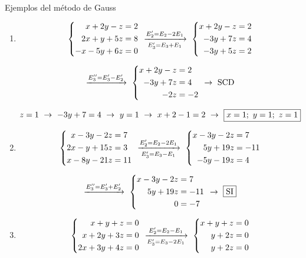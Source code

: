 \documentclass[11pt,a4paper]{article}
\newcommand{\fmdisp}[1]{\[\setbox2=\hbox{$\displaystyle #1$}\ifdim\wd2>\linewidth\resizebox{\linewidth}{!}{\box2}\else\box2\fi\]}
\begin{document}
\begin{fmex}{Ejemplos del método de Gauss}
\begin{enumerate}[label=\textbf{\arabic*.},leftmargin=*]
\item
\fmdisp{\left\{\begin{aligned}x+2y-z&=2\\ 2x+y+5z&=8\\ -x-5y+6z&=0\end{aligned}\right.\ \xrightarrow[E_3'=E_3+E_1]{E_2'=E_2-2E_1}\ \left\{\begin{aligned}x+2y-z&=2\\ -3y+7z&=4\\ -3y+5z&=2\end{aligned}\right.}

\fmdisp{\xrightarrow{E_3''=E_3'-E_2'}\ \left\{\begin{aligned}x+2y-z&=2\\ -3y+7z&=4\\ -2z&=-2\end{aligned}\right.\ \rightarrow\ \text{SCD}}

\fmdisp{z=1\ \rightarrow\ -3y+7=4\ \rightarrow\ y=1\ \rightarrow\ x+2-1=2\ \rightarrow\ \boxed{x=1;\ y=1;\ z=1}}

\item
\fmdisp{\left\{\begin{aligned}x-3y-2z&=7\\ 2x-y+15z&=3\\ x-8y-21z&=11\end{aligned}\right.\ \xrightarrow[E_3'=E_3-E_1]{E_2'=E_2-2E_1}\ \left\{\begin{aligned}x-3y-2z&=7\\ 5y+19z&=-11\\ -5y-19z&=4\end{aligned}\right.}

\fmdisp{\xrightarrow{E_3''=E_3'+E_2'}\ \left\{\begin{aligned}x-3y-2z&=7\\ 5y+19z&=-11\\ 0&=-7\end{aligned}\right.\ \rightarrow\ \boxed{\text{SI}}}

\item
\fmdisp{\left\{\begin{aligned}x+y+z&=0\\ x+2y+3z&=0\\ 2x+3y+4z&=0\end{aligned}\right.\ \xrightarrow[E_3'=E_3-2E_1]{E_2'=E_2-E_1}\ \left\{\begin{aligned}x+y+z&=0\\ y+2z&=0\\ y+2z&=0\end{aligned}\right.}


\end{enumerate}
\end{fmex}
\end{document}
